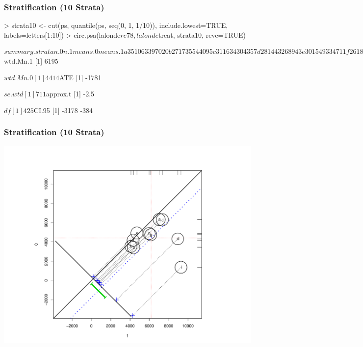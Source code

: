 \documentclass[10pt,slidestop,mathserif,c]{beamer}
\begin{document}
\begin{frame}[containsverbatim,fragile,shrink=.8]
    \frametitle{Stratification (10 Strata)}
\begin{Schunk}
\begin{Sinput}
> strata10 <- cut(ps, quantile(ps, seq(0, 1, 1/10)), include.lowest=TRUE, labels=letters[1:10])
> circ.psa(lalonde$re78, lalonde$treat, strata10, revc=TRUE)
\end{Sinput}
\begin{Soutput}
$summary.strata
  n.0 n.1 means.0 means.1
a  35  10    6339    7020
b  27  17    3554    4095
c  31  16    3430    4357
d  28  14    4326    8943
e  30  15    4933    4711
f  26  18    4188    4315
g  22  22    4755    6149
h  20  25    4879    5980
i  16  28    1375    9276
j  25  20    6316    7351

$wtd.Mn.1
[1] 6195

$wtd.Mn.0
[1] 4414

$ATE
[1] -1781

$se.wtd
[1] 711

$approx.t
[1] -2.5

$df
[1] 425

$CI.95
[1] -3178  -384
\end{Soutput}
\end{Schunk}
\end{frame}

\begin{frame}
    \frametitle{Stratification (10 Strata)}
    \begin{center}
        \includegraphics{figures/Slides-circpsa10}
    \end{center}    
\end{frame}
\end{document}
